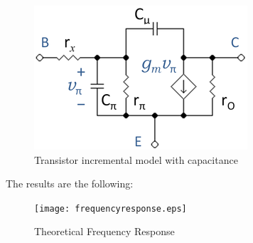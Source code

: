  \begin{figure}[h] \centering
\includegraphics[width=0.99\linewidth]{transistor.png}
\vspace{-5mm}
\caption{Transistor incremental model with capacitance}\label{fig:rc}
\end{figure}

The results are the following:

 \begin{figure}[h] \centering
\texttt{[image: frequencyresponse.eps]}
\vspace{-5mm}
\caption{Theoretical Frequency Response}\label{fig:rc}
\end{figure}


